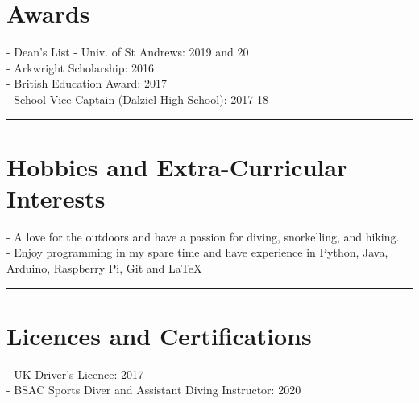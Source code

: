 %
%

\section*{Awards}
\begin{multicols}{2}
 - Dean’s List - Univ. of St Andrews: 2019 and 20\\
 - Arkwright Scholarship: 2016\\
 - British Education Award: 2017\\
 - School Vice-Captain (Dalziel High School): 2017-18
\end{multicols}

\noindent\rule[2ex]{\linewidth}{1pt}


\section*{Hobbies and Extra-Curricular Interests}
 - A love for the outdoors and have a passion for diving, snorkelling, and hiking.\\
 - Enjoy programming in my spare time and have experience in Python, Java, Arduino, Raspberry Pi, Git and \LaTeX

\noindent\rule[1ex]{\linewidth}{1pt}

\section*{Licences and Certifications}
 - UK Driver’s Licence: 2017\\
 - BSAC Sports Diver and Assistant Diving Instructor: 2020


